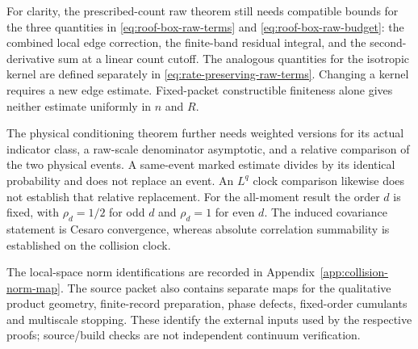 For clarity, the prescribed-count raw theorem still needs compatible
bounds for the three quantities in
\eqref{eq:roof-box-raw-terms} and
\eqref{eq:roof-box-raw-budget}: the combined local edge correction,
the finite-band residual integral, and the second-derivative sum at
a linear count cutoff. The analogous quantities for the isotropic
kernel are defined separately in
\eqref{eq:rate-preserving-raw-terms}. Changing a kernel requires a
new edge estimate. Fixed-packet constructible finiteness alone gives
neither estimate uniformly in $n$ and $R$.

The physical conditioning theorem further needs weighted versions for
its actual indicator class, a raw-scale denominator asymptotic, and a
relative comparison of the two physical events. A same-event marked
estimate divides by its identical probability and does not replace an
event. An $L^q$ clock comparison likewise does not establish that
relative replacement. For the all-moment result the order $d$ is fixed,
with $\rho_d=1/2$ for odd $d$ and $\rho_d=1$ for even $d$.
The induced covariance statement is Cesaro convergence, whereas
absolute correlation summability is established on the collision clock.

The local-space norm identifications are recorded in
Appendix~\ref{app:collision-norm-map}. The source packet also contains
separate maps for the qualitative product geometry, finite-record
preparation, phase defects, fixed-order cumulants and multiscale
stopping. These identify the external inputs used by the respective
proofs; source/build checks are not independent continuum verification.

